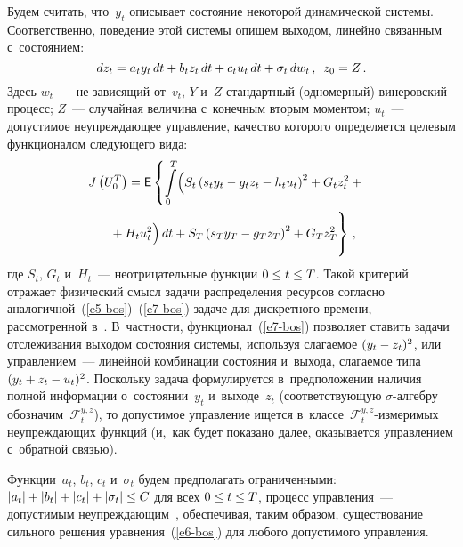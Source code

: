 \begin{multicols}{2}
     Будем считать, что~$y_t$ описывает состояние некоторой 
динамической системы. Соответственно, поведение этой сис\-те\-мы опишем 
выходом, линейно связанным с~со\-сто\-янием:
     \begin{equation}
     dz_t=a_t y_t \,dt+ b_t z_t \,dt+ c_t u_t \,dt+\sigma_t \,dw_t\,,\enskip
     z_0=Z\,.
     \label{e6-bos}
     \end{equation}
Здесь $w_t$~--- не зависящий от~$v_t$, $Y$ и~$Z$ стандартный (одномерный) 
винеровский процесс; $Z$~--- случайная величина с~конечным вторым 
моментом; $u_t$~--- допустимое неупреждающее управ\-ле\-ние, качество 
которого определяется целевым функционалом следующего вида:
\begin{multline}
\!\hspace*{-3.98538pt}J\left( U_0^T\right) ={\sf E}\left\{ \int\limits_0^T \!\left( S_t\left( s_ty_t-g_t z_t -h_t 
u_t\right)^2 +G_t z_t^2+{}\right.\right.\\
\left.\left.{}+ H_t u_t^2
\vphantom{S_t\left( s_ty_t-g_t z_t -h_t 
u_t\right)^2}
\right) dt+S_T\left( s_T y_T -g_T 
z_T\right)^2+G_T z_T^2
\vphantom{\int\limits_0^T}\right\}\,,
\label{e7-bos}
\end{multline}
где $S_t$, $G_t$ и~$H_t$~--- неотрицательные функции\linebreak
$0\hm\leq t\hm\leq T$. 
Такой критерий отражает физический смысл задачи распределения ресурсов 
со\-глас\-но аналогичной~(\ref{e5-bos})--(\ref{e7-bos}) задаче для дис\-крет\-но\-го 
времени, рас\-смот\-рен\-ной в~\cite{7-bos}. В~част\-ности,  
функци\-онал~(\ref{e7-bos}) поз\-во\-ля\-ет ставить задачи отслеживания
 выходом 
со\-сто\-яния сис\-те\-мы, используя сла\-га\-емое $(y_t\hm- z_t)^2$, или 
управлением~--- линейной комбинации со\-сто\-яния и~выхода, сла\-га\-емое типа\linebreak 
$(y_t\hm+ z_t\hm- u_t)^2$. Поскольку задача формулируется 
в~предположении наличия пол\-ной информации о~со\-сто\-янии~$y_t$ 
и~выходе~$z_t$ (соответствующую $\sigma$-ал\-геб\-ру 
обозначим~$\mathcal{F}_t^{y,z}$), то допустимое управ\-ле\-ние ищется 
в~классе~$\mathcal{F}_t^{y,z}$-из\-ме\-ри\-мых неупреждающих функций 
(и,~как будет показано далее, оказывается управ\-ле\-ни\-ем с~обратной связью).

     Функции~$a_t$, $b_t$, $c_t$ и~$\sigma_t$ будем предполагать 
ограниченными: $\vert a_t\vert \hm+ \vert b_t\vert \hm+\vert c_t\vert \hm+ \vert 
\sigma_t \vert \hm\leq C$ для всех $0\hm\leq t\hm\leq T$, процесс  
управления~--- допустимым не\-упреж\-да\-ющим~\cite{9-bos}, обеспечивая, 
таким образом, существование сильного решения урав\-не\-ния~(\ref{e6-bos}) 
для любого допустимого управ\-ления.
     

\end{multicols}

